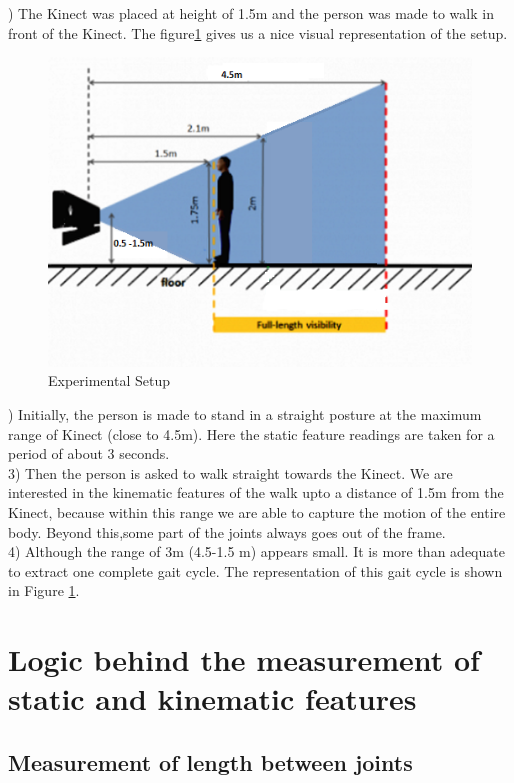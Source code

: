 ) The Kinect was placed at height of 1.5m and the person was made to walk in front of the Kinect. The figure\ref{fig:exp.png} gives us a nice visual  representation of the setup.
\begin{figure}[h]
\centering
\includegraphics[scale=0.8]{exp.png}
\caption{Experimental Setup}
\label{fig:exp.png}
\end{figure}
) Initially, the person is made to stand in a straight posture at the maximum range of Kinect (close to 4.5m). Here the static feature readings are taken for a period of about 3 seconds.\\
3) Then the person is asked to walk straight towards the Kinect. We are interested in the kinematic features of the walk upto a distance of 1.5m from the Kinect, because within this range we are able to capture the motion of the entire body. Beyond this,some part of the joints always goes out of the frame.\\
4) Although the range of 3m (4.5-1.5 m) appears small. It is more than adequate to extract one complete gait cycle. The representation of this gait cycle is shown in Figure \ref{fig:exp.png}.\\

\section{Logic behind the measurement of static and kinematic features}\label{Logic behind the measurement of static and kinematic features} 
\subsection{Measurement of length between joints}\label{Measurement of length between joints} 

